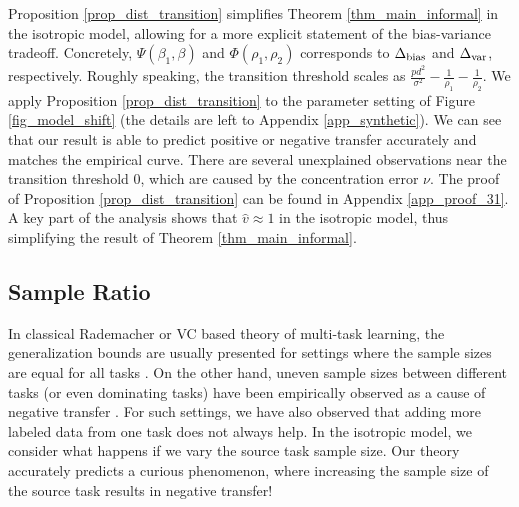 Proposition \ref{prop_dist_transition} simplifies Theorem \ref{thm_main_informal} in the isotropic model, allowing for a more explicit statement of the bias-variance tradeoff.
Concretely, $\Psi(\beta_1, \beta)$ and $\Phi(\rho_1, \rho_2)$ corresponds to $\Delta_{\text{bias}}$ and $\Delta_{\text{var}}$, respectively.
Roughly speaking, the transition threshold scales as $\frac{pd^2}{\sigma^2} - \frac{1}{\rho_1} - \frac{1}{\rho_2}$.
We apply Proposition \ref{prop_dist_transition} to the parameter setting of Figure \ref{fig_model_shift} (the details are left to Appendix \ref{app_synthetic}).
We can see that our result is able to predict positive or negative transfer  accurately and matches the empirical curve.
There are several unexplained observations near the transition threshold $0$, which are caused by the concentration error $\nu$.
The proof of Proposition \ref{prop_dist_transition} can be found in Appendix \ref{app_proof_31}.
A key part of the analysis shows that $\hat{v}\approx 1$ in the isotropic model,
thus simplifying the result of Theorem \ref{thm_main_informal}.

\subsection{Sample Ratio}\label{sec_data_size}

In classical Rademacher or VC based theory of multi-task learning, the generalization bounds are usually presented for settings where the sample sizes are equal for all tasks \cite{B00,M06,MPR16}.
On the other hand, uneven sample sizes between different tasks (or even dominating tasks) have been empirically observed as a cause of negative transfer \cite{YKGLHF20}.
For such settings, we have also observed that adding more labeled data from one task does not always help.
In the isotropic model, we consider what happens if we vary the source task sample size.
Our theory accurately predicts a curious phenomenon, where increasing the sample size of the source task results in negative transfer!

